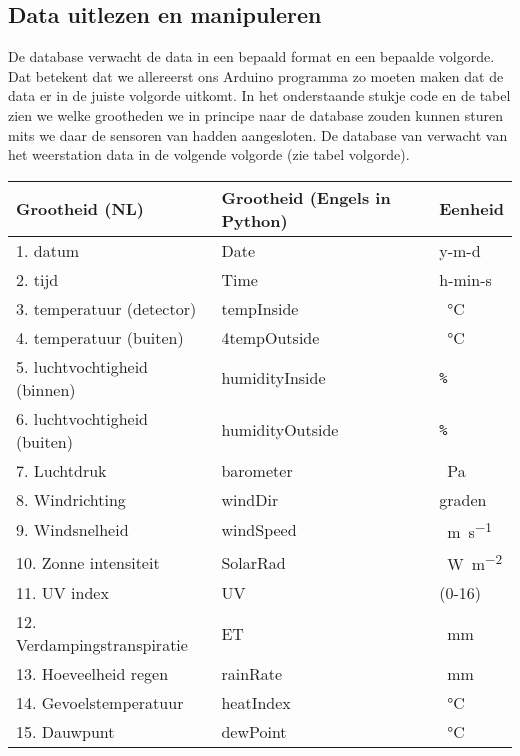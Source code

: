 \subsection{Data uitlezen en manipuleren} De \hisparc database verwacht
de data in een bepaald format en een bepaalde volgorde. Dat betekent dat
we allereerst ons Arduino programma zo moeten maken dat de data er in de
juiste volgorde uitkomt.
In het onderstaande stukje code en de tabel zien we welke grootheden we in principe naar de 
\hisparc database zouden kunnen sturen mits we daar de sensoren van hadden aangesloten.
De database van \hisparc verwacht van het weerstation data in de volgende 
volgorde (zie tabel volgorde). 

\begin{center}
\begin{table}
    \begin{tabular}{ | l | l | l|}
    \hline
    \textbf{Grootheid (NL)}& \textbf{Grootheid (Engels in Python)} & \textbf{Eenheid}  \\ \hline
    1. datum & Date   & y-m-d  \\ \hline
    2. tijd & Time    & h-min-s   \\ \hline
    3. temperatuur (detector) & tempInside & \SI{}{\celsius}    \\ \hline
    4. temperatuur (buiten) & 4tempOutside  & \SI{}{\celsius}    \\ \hline
    5. luchtvochtigheid (binnen)  & humidityInside & \verb|%|     \\ \hline
    6. luchtvochtigheid (buiten) & humidityOutside  & \verb|%|    \\ \hline
    7. Luchtdruk & barometer &  \SI{}{\pascal}   \\ \hline
    8. Windrichting & windDir &  graden \\ \hline
    9. Windsnelheid & windSpeed  &  \SI{}{\meter\per\second} \\ \hline
    10. Zonne intensiteit & SolarRad & \SI{}{\watt\per\square\meter}    \\ \hline
    11. UV index & UV & (0-16)    \\ \hline
    12. Verdampingstranspiratie & ET &  \SI{}{\milli\meter}    \\ \hline
    13. Hoeveelheid regen & rainRate & \SI{}{\milli\meter} \\ \hline
    14. Gevoelstemperatuur & heatIndex & \SI{}{\celsius} \\ \hline
    15. Dauwpunt & dewPoint & \SI{}{\celsius}    \\ \hline

\end{tabular}
\end{table}
\end{center}
